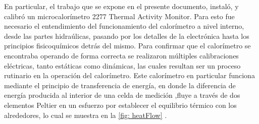 	En particular, el trabajo que se expone en el presente documento, instal\'o, y calibr\'o un microcalorímetro 2277 Thermal Activity Monitor. Para esto fue necesario el entendimiento del funcionamiento del calorímetro a nivel interno, desde las partes hidra\'ulicas, pasando por los detalles de la electrónica hasta los principios fisicoquímicos detrás del mismo. Para confirmar que el calor\'imetro se encontraba operando de forma correcta se realizaron m\'ultiples calibraciones el\'ectricas, tanto est\'aticas como din\'amicas, las cuales resultan ser un proceso rutinario en la operaci\'on del calor\'imetro. Este calor\'imetro en particular funciona mediante el principio de transferencia de energ\'ia, en donde la diferencia de energ\'ia producida al interior de una celda de medici\'on ,fluye a trav\'es de dos elementos Peltier en un esfuerzo por establecer el equilibrio t\'ermico con los alrededores, lo cual se muestra en la \autoref{fig: heatFlow} \cite{Suurkuusk}.
